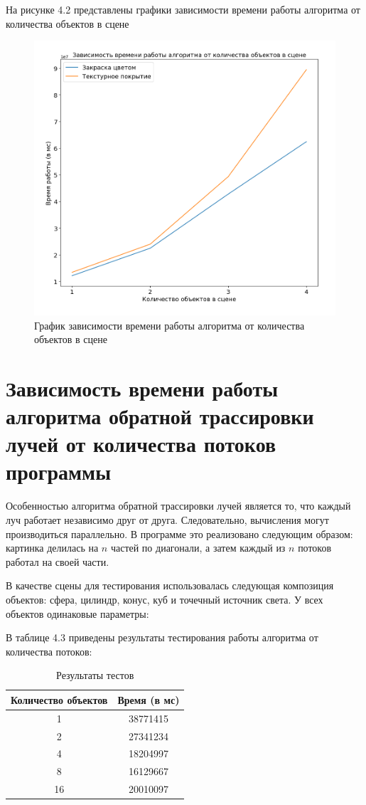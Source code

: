 На рисунке 4.2 представлены графики зависимости времени работы алгоритма от количества объектов в сцене
\FloatBarrier
\begin{figure}[h]
	\begin{center}
		\includegraphics[width=\linewidth]{inc/obj.png}
	\end{center}
	\caption{График зависимости времени работы алгоритма от количества объектов в сцене}
\end{figure}
\FloatBarrier

\section{Зависимость времени работы алгоритма обратной трассировки лучей от количества потоков программы}
Особенностью алгоритма обратной трассировки лучей является то, что каждый луч работает независимо друг от друга.
Следовательно, вычисления могут производиться параллельно.
В программе это реализовано следующим образом: картинка делилась на $n$ частей по диагонали, а затем каждый из $n$ потоков работал на своей части.

В качестве сцены для тестирования использовалась следующая композиция объектов: сфера, цилиндр, конус, куб и точечный источник света.
У всех объектов одинаковые параметры:

В таблице 4.3 приведены результаты тестирования работы алгоритма от количества потоков:
\FloatBarrier
\begin{table}[h]
	\caption{Результаты тестов}
	\centering
	\begin{tabular}{ | c | c |}
		\hline
		Количество объектов & Время (в мс) \\ 
		\hline
		1 & 38771415 \\
		2 & 27341234 \\
		4 & 18204997 \\
		8 & 16129667 \\
		16 & 20010097\\
		\hline
	\end{tabular}
\end{table}
\FloatBarrier

